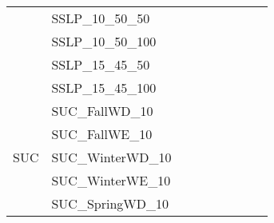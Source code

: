 \begin{table}[]
{\begin{tabular}{|c|l|ll|ll|l|l|l|}
			& SSLP\_10\_50\_50              &                                 &                                &                                  &                                 &                                    &                            &                            \\
			& SSLP\_10\_50\_100             &                                 &                                &                                  &                                 &                                    &                            &                            \\
			& SSLP\_15\_45\_50              &                                 &                                &                                  &                                 &                                    &                            &                            \\
			& SSLP\_15\_45\_100             &                                 &                                &                                  &                                 &                                    &                            &                            \\ \hline
			\multirow{8}{*}{SUC}     & SUC\_FallWD\_10               &                                 &                                &                                  &                                 &                                    &                            &                            \\
			& SUC\_FallWE\_10               &                                 &                                &                                  &                                 &                                    &                            &                            \\
			& SUC\_WinterWD\_10             &                                 &                                &                                  &                                 &                                    &                            &                            \\
			& SUC\_WinterWE\_10             &                                 &                                &                                  &                                 &                                    &                            &                            \\
			& SUC\_SpringWD\_10             &                                 &                                &                                  &                                 &                                    &                            &                            \\

\end{tabular}}
\end{table}
